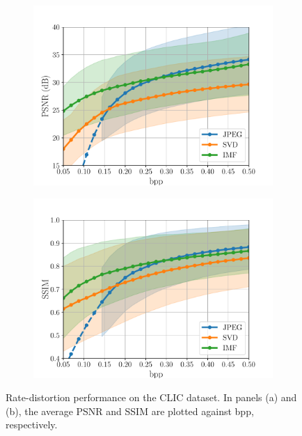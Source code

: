 \begin{figure}[t]
	\centering
	\begin{subfigure}{.5\textwidth}
		\centering
		\includegraphics[width=.95\textwidth]{figures/comparison_clic_psnr.pdf}
		\caption{}
		\label{fig: psnr-vs-bpp clic}
	\end{subfigure}%
	\begin{subfigure}{.5\textwidth}
		\centering
		\includegraphics[width=.95\textwidth]{figures/comparison_clic_ssim.pdf}
		\caption{}
		\label{fig: ssim-vs-bpp clic}
	\end{subfigure}
	\caption{Rate-distortion performance on the CLIC dataset. In panels (a) and (b), the average PSNR and SSIM are plotted against bpp, respectively.}
	\label{fig:compression_performance_clic}
\end{figure}


